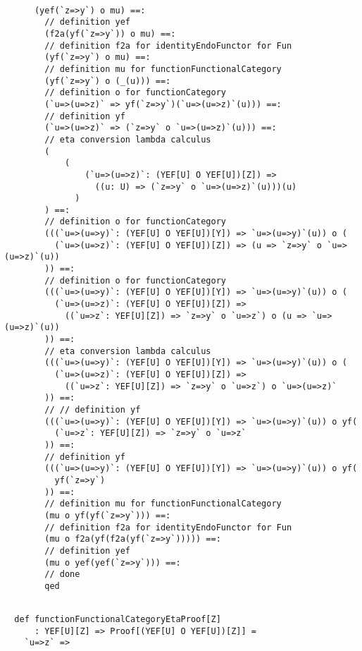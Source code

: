 \documentclass[11pt]{article}
\begin{document}
\vspace{6pt}
\clearpage
\begin{mdframed}[backgroundcolor=lightgray!20] 
\begin{lstlisting} 
      
      (yef(`z=>y`) o mu) ==:
        // definition yef
        (f2a(yf(`z=>y`)) o mu) ==:
        // definition f2a for identityEndoFunctor for Fun
        (yf(`z=>y`) o mu) ==:
        // definition mu for functionFunctionalCategory
        (yf(`z=>y`) o (_(u))) ==:
        // definition o for functionCategory
        (`u=>(u=>z)` => yf(`z=>y`)(`u=>(u=>z)`(u))) ==:
        // definition yf
        (`u=>(u=>z)` => (`z=>y` o `u=>(u=>z)`(u))) ==:
        // eta conversion lambda calculus
        (
            (
                (`u=>(u=>z)`: (YEF[U] O YEF[U])[Z]) =>
                  ((u: U) => (`z=>y` o `u=>(u=>z)`(u)))(u)
              )
        ) ==:
        // definition o for functionCategory
        (((`u=>(u=>y)`: (YEF[U] O YEF[U])[Y]) => `u=>(u=>y)`(u)) o (
          (`u=>(u=>z)`: (YEF[U] O YEF[U])[Z]) => (u => `z=>y` o `u=>(u=>z)`(u))
        )) ==:
        // definition o for functionCategory
        (((`u=>(u=>y)`: (YEF[U] O YEF[U])[Y]) => `u=>(u=>y)`(u)) o (
          (`u=>(u=>z)`: (YEF[U] O YEF[U])[Z]) =>
            ((`u=>z`: YEF[U][Z]) => `z=>y` o `u=>z`) o (u => `u=>(u=>z)`(u))
        )) ==:
        // eta conversion lambda calculus
        (((`u=>(u=>y)`: (YEF[U] O YEF[U])[Y]) => `u=>(u=>y)`(u)) o (
          (`u=>(u=>z)`: (YEF[U] O YEF[U])[Z]) =>
            ((`u=>z`: YEF[U][Z]) => `z=>y` o `u=>z`) o `u=>(u=>z)`
        )) ==:
        // // definition yf
        (((`u=>(u=>y)`: (YEF[U] O YEF[U])[Y]) => `u=>(u=>y)`(u)) o yf(
          (`u=>z`: YEF[U][Z]) => `z=>y` o `u=>z`
        )) ==:
        // definition yf
        (((`u=>(u=>y)`: (YEF[U] O YEF[U])[Y]) => `u=>(u=>y)`(u)) o yf(
          yf(`z=>y`)
        )) ==:
        // definition mu for functionFunctionalCategory
        (mu o yf(yf(`z=>y`))) ==:
        // definition f2a for identityEndoFunctor for Fun
        (mu o f2a(yf(f2a(yf(`z=>y`))))) ==:
        // definition yef
        (mu o yef(yef(`z=>y`))) ==:
        // done
        qed
\end{lstlisting}
\end{mdframed}
\vspace{6pt}
\begin{mdframed}[backgroundcolor=lightgray!20] 
\begin{lstlisting} 
  
  def functionFunctionalCategoryEtaProof[Z]
      : YEF[U][Z] => Proof[(YEF[U] O YEF[U])[Z]] =
    `u=>z` =>
\end{lstlisting}
\end{mdframed}
\end{document}
